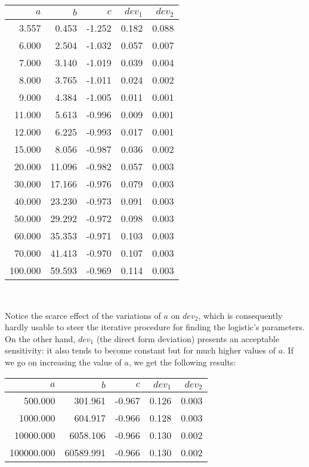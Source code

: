 \documentclass[%
 aip,
 jmp,%
 amsmath,amssymb,
 reprint,%
]{revtex4-1}
\begin{document}
{\centering
\begin{tabular}{rrrrr}
 $a$ & $b$ & $c$ & $dev_1$ & $dev_2$  \\ \hline
 	3.557 & 0.453 & -1.252 & 0.182 & 0.088 \\   
	6.000 & 2.504 & -1.032 & 0.057 & 0.007 \\     
	7.000 & 3.140 & -1.019 & 0.039 & 0.004 \\      
	8.000 & 3.765 & -1.011 & 0.024 & 0.002 \\      
	9.000 & 4.384 & -1.005 & 0.011 & 0.001 \\      
	11.000 & 5.613 & -0.996 & 0.009 & 0.001 \\      
	12.000 & 6.225 & -0.993 & 0.017 & 0.001 \\      
	15.000 & 8.056 & -0.987 & 0.036	& 0.002 \\      
	20.000 & 11.096 & -0.982 & 0.057 & 0.003 \\      
	30.000 & 17.166 & -0.976 & 0.079 & 0.003 \\      
	40.000 & 23.230 & -0.973 & 0.091 & 0.003 \\      
	50.000 & 29.292	& -0.972 & 0.098 & 0.003 \\      
	60.000 & 35.353 & -0.971 & 0.103 & 0.003 \\      
	70.000 & 41.413 & -0.970 & 0.107 & 0.003 \\      
	100.000	& 59.593 & -0.969 & 0.114 &	0.003    
\end{tabular}\\[4mm]}

Notice the scarce effect of the variations of $a$ on $dev_2$, which is consequently hardly usable to steer the iterative procedure for finding the logistic's parameters.  On the  other hand, $dev_1$ (the direct form deviation) presents an acceptable sensitivity: it also tends to become constant but for much higher values of  $a$.
If we go on increasing the value of $a$, we get the following results:

{\centering
\begin{tabular}{rrrrr}
 $a$ & $b$ & $c$ & $dev_1$ & $dev_2$  \\ \hline
 500.000 & 301.961 & -0.967 & 0.126 & 0.003 \\
 1000.000 & 604.917 & -0.966 & 0.128 & 0.003 \\
 10000.000 & 6058.106 & -0.966 & 0.130 & 0.002 \\
 100000.000	& 60589.991 & -0.966 & 0.130 & 0.002	 
\end{tabular}\\[4mm]}
\end{document}
